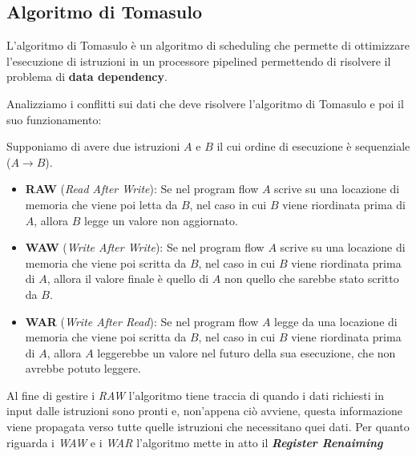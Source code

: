 \subsection{Algoritmo di Tomasulo}\label{subsec:tomasulo}
L'algoritmo di Tomasulo è un algoritmo di scheduling che permette di ottimizzare l'esecuzione di istruzioni in un processore pipelined permettendo di risolvere il problema di \textbf{data dependency}.

Analizziamo i conflitti sui dati che deve risolvere l'algoritmo di Tomasulo e poi il suo funzionamento:
\begin{proposition}
    Supponiamo di avere due istruzioni $A$ e $B$ il cui ordine di esecuzione è sequenziale ($A\rightarrow B$).
    \begin{itemize}
        \item \textbf{RAW} (\textit{Read After Write}): Se nel program flow $A$ scrive su una locazione di memoria che viene poi letta da $B$, nel caso in cui $B$ viene riordinata prima di $A$, allora $B$ legge un valore non aggiornato.
        \item \textbf{WAW} (\textit{Write After Write}): Se nel program flow $A$ scrive su una locazione di memoria che viene poi scritta da $B$, nel caso in cui $B$ viene riordinata prima di $A$, allora il valore finale è quello di $A$ non quello che sarebbe stato scritto da $B$.
        \item \textbf{WAR} (\textit{Write After Read}): Se nel program flow $A$ legge da una locazione di memoria che viene poi scritta da $B$, nel caso in cui $B$ viene riordinata prima di $A$, allora $A$ leggerebbe un valore nel futuro della sua esecuzione, che non avrebbe potuto leggere.
    \end{itemize}
\end{proposition}
Al fine di gestire i \textit{RAW} l'algoritmo tiene traccia di quando i dati richiesti in input dalle istruzioni sono pronti e, non'appena ciò avviene, questa informazione viene propagata verso tutte quelle istruzioni che necessitano quei dati. Per quanto riguarda i \textit{WAW} e i \textit{WAR} l'algoritmo mette in atto il \textbf{\textit{Register Renaiming}}
